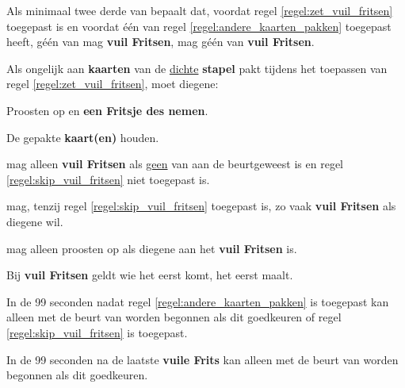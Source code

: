 \vervolgLijst{}
\item Als minimaal twee derde van \alleSpelers bepaalt dat, voordat regel \ref{regel:zet_vuil_fritsen} toegepast is en voordat \'e\'en van \alleSpelers regel \ref{regel:andere_kaarten_pakken} toegepast heeft, géén van \alleSpelers mag \textbf{vuil Fritsen}, mag géén van \alleSpelers \textbf{vuil Fritsen}.
\label{regel:skip_vuil_fritsen}
\eindLijst{}

\vervolgLijst{}
\item Als \eenSpeler ongelijk aan \Frits \textbf{kaarten} van de \ul{dichte} \textbf{stapel} pakt tijdens het toepassen van regel \ref{regel:zet_vuil_fritsen}, moet diegene:
\puntLijst{}
\item Proosten op  en \textbf{een Fritsje des nemen}\footnotemark[3].
\item De gepakte \textbf{kaart(en)} houden.
\eindPuntLijst{}
\eindLijst{}

\vervolgLijst{}
\item \EenSpeler mag alleen \textbf{vuil Fritsen} als \ul{geen} van \alleSpelers aan de beurt\footnotemark[1] geweest is en regel \ref{regel:skip_vuil_fritsen} niet toegepast is.
\eindLijst{}

\vervolgLijst{}
\item \EenSpeler mag, tenzij regel \ref{regel:skip_vuil_fritsen} toegepast is, zo vaak \textbf{vuil Fritsen} als diegene wil.
\eindLijst{}

\vervolgLijst{}
\item \EenSpeler mag alleen proosten op  als diegene aan het \textbf{vuil Fritsen} is.
\eindLijst{}

\vervolgLijst{}
\item Bij \textbf{vuil Fritsen} geldt wie het eerst komt, het eerst maalt.
\eindLijst{}


\vervolgLijst{}
\item In de 99 seconden nadat regel \ref{regel:andere_kaarten_pakken} is toegepast kan alleen met de beurt van \Willem worden begonnen als \alleSpelers dit goedkeuren of regel \ref{regel:skip_vuil_fritsen} is toegepast.
\label{regel:vuile_frits_1}
\eindLijst{}

\vervolgLijst{}
\item In de 99 seconden na de laatste \textbf{vuile Frits} kan alleen met de beurt van \Willem worden begonnen als \alleSpelers dit goedkeuren.
\label{regel:vuile_frits_2}
\eindLijst{}

